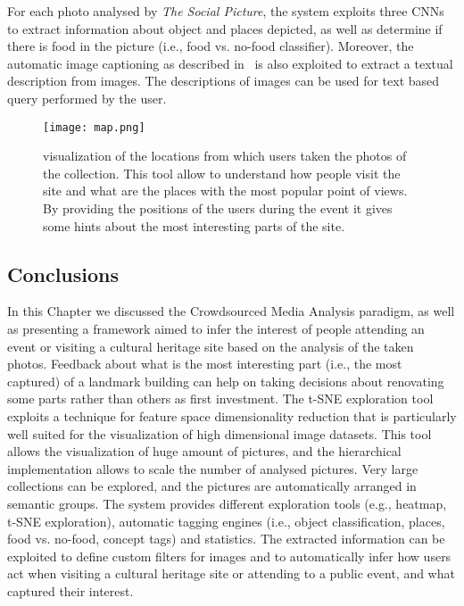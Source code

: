 For each photo analysed by \textit{The Social Picture}, the system exploits three CNNs to extract information about object and places depicted, as well as determine if there is food in the picture (i.e., food vs. no-food classifier). Moreover, the automatic image captioning as described in~\cite{johnson2015densecap} is also exploited to extract a textual description from images. %
The descriptions of images can be used for text based query performed by the user.
\begin{figure*}
	\centering
	\texttt{[image: map.png]}
	\caption{visualization of the locations from which users taken the photos of the collection. This tool allow to understand how people visit the site and what are the places with the most popular point of views. By providing the positions of the users during the event it gives some hints about the most interesting parts of the site. }
	\label{mapGPS}
\end{figure*}

\subsection{Conclusions}
In this Chapter we discussed the Crowdsourced Media Analysis paradigm, as well as presenting a framework aimed to infer the interest of people attending an event or visiting a cultural heritage site based on the analysis of the taken photos.
Feedback about what is the most interesting part (i.e., the most captured) of a landmark building can help on taking decisions about renovating some parts rather than others as first investment.
The t-SNE exploration tool exploits a technique for feature space dimensionality reduction that is particularly well suited for the visualization of high dimensional image datasets. This tool allows the visualization of huge amount of pictures, and the hierarchical implementation allows to scale the number of analysed pictures. Very large collections can be explored, and the pictures are automatically arranged in semantic groups.
The system provides different exploration tools (e.g., heatmap, t-SNE exploration), automatic tagging engines (i.e., object classification, places, food vs. no-food, concept tags) and statistics. The extracted information can be exploited to define custom filters for images and to automatically infer how users act when visiting a cultural heritage site or attending to a public event, and what captured their interest. 

